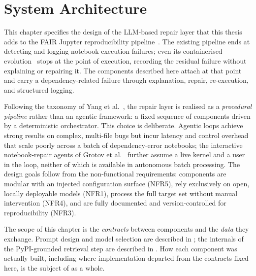 %

\chapter{System Architecture}
\label{chap:architecture}

This chapter specifies the design of the LLM-based repair layer that
this thesis adds to the FAIR Jupyter reproducibility
pipeline~\cite{samuel2024gigascience}.
The existing pipeline ends at detecting and logging notebook execution
failures; even its containerised
evolution~\cite{samuel2025docker}
stops at the point of execution, recording the residual failure without
explaining or repairing it. The components described here attach at that
point and carry a dependency-related failure through explanation, repair,
re-execution, and structured logging.

Following the taxonomy of Yang et al.~\cite{yang2025aprsurvey},
the repair layer is realised as a \emph{procedural pipeline} rather than
an agentic framework: a fixed sequence of components driven by a
deterministic orchestrator. This choice is deliberate. Agentic loops
achieve strong results on complex, multi-file bugs but incur latency and
control overhead that scale poorly across a batch of dependency-error
notebooks; the interactive notebook-repair agents of Grotov et
al.~\cite{grotov2024untangling,grotov2024debug}
further assume a live kernel and a user in the loop, neither of which is
available in autonomous batch processing. The design goals follow from
the non-functional requirements: components are modular with an injected
configuration surface (NFR5), rely exclusively on open, locally
deployable models (NFR1), process the full target set without manual
intervention (NFR4), and are fully documented and version-controlled for
reproducibility (NFR3).

The scope of this chapter is the \emph{contracts} between components and
the \emph{data} they exchange. Prompt design and model selection are
described in ; the internals of the
PyPI-grounded retrieval step are described in . How each
component was actually built, including where implementation departed from
the contracts fixed here, is the subject of  as a
whole.


